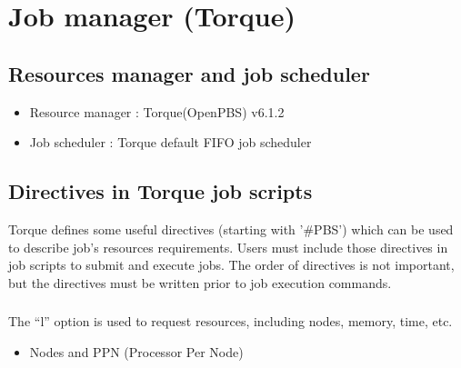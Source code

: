\documentclass[a4paper,11pt,english]{sphinxmanual}
\begin{document}
\section{Job manager (Torque)}
\label{\detokenize{guide:job-manager-torque}}\label{\detokenize{guide:batch-details}}

\subsection{Resources manager and job scheduler}
\label{\detokenize{guide:resources-manager-and-job-scheduler}}\begin{itemize}
\item {} 
\sphinxAtStartPar
Resource manager : Torque(OpenPBS) v6.1.2

\item {} 
\sphinxAtStartPar
Job scheduler : Torque default FIFO job scheduler

\end{itemize}


\subsection{Directives in Torque job scripts}
\label{\detokenize{guide:directives-in-torque-job-scripts}}
\sphinxAtStartPar
Torque defines some useful directives (starting with '\#PBS') which can be used to describe job’s resources requirements. Users must include those directives in job scripts to submit and execute jobs.
The order of directives is not important, but the directives must be written prior to job execution commands.


\subsubsection{}
\label{\detokenize{guide:resource-limits}}
\sphinxAtStartPar
The “\sphinxhyphen{}l” option is used to request resources, including nodes, memory, time, etc.
\begin{itemize}
\item {} 
\sphinxAtStartPar
Nodes and PPN (Processor Per Node)

\end{itemize}
\end{document}
